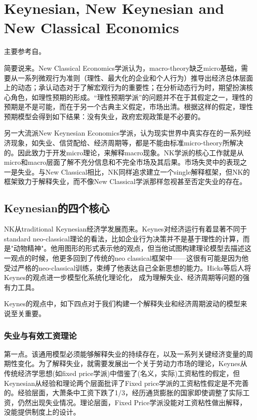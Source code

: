 \chapter{Keynesian, New Keynesian and New Classical Economics}
\label{sec:K-NK-NCE}

主要参考自\cite{Greenwald:1987ei}。

简要说来。New Classical Economics学派认为，macro-theory缺乏micro基础，需要从一系列微观行为准则（理性、最大化的企业和个人行为）推导出经济总体层面上的动态；承认动态对于了解宏观行为的重要性；在分析动态行为时，期望扮演核心角色，如理性预期的形成。“理性预期学派”的问题并不在于其假定之一，理性的预期是不是可能，而在于另一个古典主义假定，市场出清。根据这样的假定，理性预期模型会得到如下结果：没有失业，政府宏观政策是不必要的。

另一大流派New Keynesian Economics学派，认为现实世界中真实存在的一系列经济现象，如失业、信贷配给、经济周期等，都是不能由标准micro-theory所解决的。因此致力于开发micro理论，来解释macro现象。NK学派的核心工作就是从micro和macro层面了解不充分信息和不完全市场及其后果。市场失灵中的表现之一是失业。与New Classical相比，NK同样追求建立一个single解释框架，但NK的框架致力于解释失业，而不像New Classical学派那样忽视甚至否定失业的存在。

\section{Keynesian的四个核心}
\label{sec:KNK-K-keys}
NK从traditional Keynesian经济学发展而来。Keynes对经济运行有着显著不同于standard neo-classical理论的看法，比如企业行为决策并不是基于理性的计算，而是"动物精神"。他用图形的形式表示他的观点，但当他试图构建理论模型去描述这一观点的时候，他更多回到了传统的neo classical框架中——这很有可能是因为他受过严格的neo-classical训练，束缚了他表达自己全新思想的能力。Hicks等后人将Keynes的观点进一步模型化系统化理论化，
成为理解失业、经济周期等问题的强有力工具。

Keynes的观点中，如下四点对于我们构建一个解释失业和经济周期波动的模型来说至关重要。

\subsection{失业与有效工资理论}
\label{sec:KNK-unemp-efficiency-wages}
第一点。该通用模型必须能够解释失业的持续存在，以及一系列关键经济变量的周期性变化。为了解释失业，就需要发展出一个关于劳动力市场的理论，Keynes从传统经济学思想(如fixed price学派)中借鉴了(名义，实际)工资粘性的假定，但Keynesian从经验和理论两个层面批评了Fixed price学派的工资粘性假定是不完善的。经验层面，大萧条中工资下跌了1/3，经历通货膨胀的国家即使调整了实际工资，仍然出现失业情况。理论层面，Fixed Price学派没能对工资粘性做出解释，没能提供制度上的设计。

